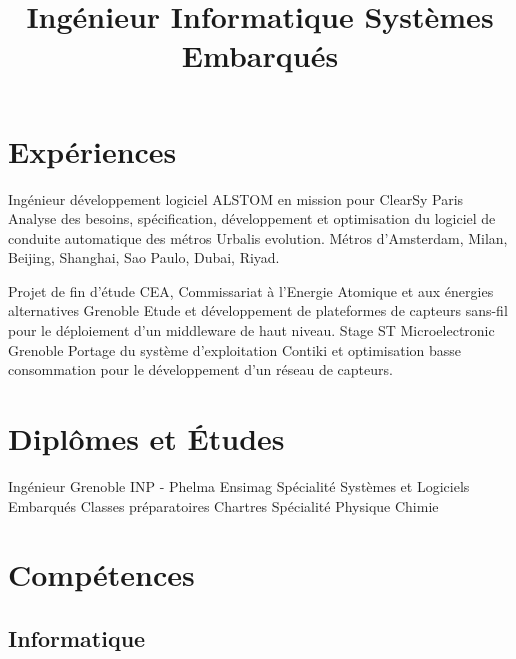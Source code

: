 \documentclass[10pt,a4paper]{moderncv}
\title{\large Ingénieur Informatique Systèmes Embarqués}
\begin{document}
\maketitle

\section{Expériences}

  {Ingénieur développement logiciel}
  {ALSTOM en mission pour ClearSy}
  {}
  {Paris}
  {Analyse des besoins, spécification, développement et optimisation du logiciel de conduite automatique des métros Urbalis evolution.\newline{} Métros d'Amsterdam, Milan, Beijing, Shanghai, Sao Paulo, Dubai, Riyad.\newline{}}

  {Projet de fin d'étude}
  {CEA, Commissariat à l'Energie Atomique et aux énergies alternatives}
  {}
  {Grenoble}
  {Etude et développement de plateformes de capteurs sans-fil pour le déploiement d'un middleware de haut niveau.\newline{}}
  {Stage}
  {ST Microelectronic}
  {}
  {Grenoble}
  {Portage du système d'exploitation Contiki et optimisation basse consommation pour le développement d'un réseau de capteurs.\newline{}}

\section{Diplômes et Études}
  {Ingénieur Grenoble INP - Phelma Ensimag}
  {}
  {}
  {}
  {Spécialité Systèmes et Logiciels Embarqués\newline{}}
  {Classes préparatoires}
  {}
  {}
  {Chartres}
  {Spécialité Physique Chimie\newline{}}

\section{Compétences}

  \subsection{Informatique}
\end{document}
